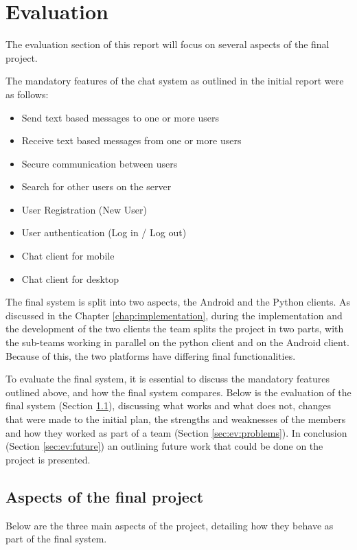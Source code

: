 \documentclass[finalReport.tex]{subfiles}
\begin{document}
\chapter{Evaluation}\label{ch:eval}

The evaluation section of this report will focus on several aspects of the final project. 

The mandatory features of the chat system as outlined in the initial report were as follows:
\begin{itemize}
\item Send text based messages to one or more users
\item Receive text based messages from one or more users
\item Secure communication between users
\item Search for other users on the server
\item User Registration (New User)
\item User authentication (Log in / Log out)
\item Chat client for mobile
\item Chat client for desktop
\end{itemize}
	
The final system is split into two aspects, the Android and the Python clients. As discussed in the Chapter \ref{chap:implementation}, during the implementation and the development of the two clients the team splits the project in two parts, with the sub-teams working in parallel on the python client and on the Android client. Because of this, the two platforms have differing final functionalities.

To evaluate the final system, it is essential to discuss the mandatory features outlined above, and how the final system compares. Below is the evaluation of the final system (Section \ref{sec:ev:aspects}), discussing what works and what does not, changes that were made to the initial plan, the strengths and weaknesses of the members and how they worked as part of a team (Section \ref{sec:ev:problems}). In conclusion (Section \ref{sec:ev:future}) an outlining future work that could be done on the project is presented.

\section{Aspects of the final project}\label{sec:ev:aspects}
Below are the three main aspects of the project, detailing how they behave as part of the final system.
 
\end{document}
